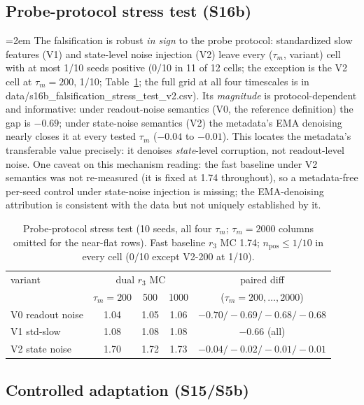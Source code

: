 \documentclass[preprint,12pt]{elsarticle}
\begin{document}
\subsection{Probe-protocol stress test (S16b)}
\label{sec:s16b}

{\emergencystretch=2em
The falsification is robust \emph{in sign} to the probe protocol:
standardized slow features (V1) and state-level noise injection (V2)
leave every ($\tau_m$, variant) cell with at most 1/10 seeds positive
(0/10 in 11 of 12 cells; the exception is the V2 cell at
$\tau_m{=}200$, 1/10; Table~\ref{tab:s16b}; the full grid at all four
timescales is in data/s16b\_falsification\_stress\_test\_v2.csv). Its
\emph{magnitude} is
protocol-dependent and informative: under readout-noise semantics (V0,
the reference definition) the gap is $-0.69$; under state-noise
semantics (V2) the metadata's EMA denoising nearly closes it at every tested
$\tau_m$ ($-0.04$ to $-0.01$). This locates the metadata's transferable
value precisely: it denoises \emph{state}-level corruption, not
readout-level noise. One caveat on this mechanism reading: the fast
baseline under V2 semantics was not re-measured (it is fixed at 1.74
throughout), so a metadata-free per-seed control under state-noise
injection is missing; the EMA-denoising attribution is consistent with
the data but not uniquely established by it.\par}

\begin{table}[t]
\centering
\small
\begin{tabular}{lcccc}
\toprule
variant & \multicolumn{3}{c}{dual $r_3$ MC} & paired diff \\
        & $\tau_m{=}200$ & 500 & 1000 & ($\tau_m{=}200,\dots,2000$) \\
\midrule
V0 readout noise & 1.04 & 1.05 & 1.06 & $-0.70/-0.69/-0.68/-0.68$ \\
V1 std-slow      & 1.08 & 1.08 & 1.08 & $-0.66$ (all) \\
V2 state noise   & 1.70 & 1.72 & 1.73 & $-0.04/-0.02/-0.01/-0.01$ \\
\bottomrule
\end{tabular}
\caption{Probe-protocol stress test (10 seeds, all four $\tau_m$;
$\tau_m{=}2000$ columns omitted for the near-flat rows). Fast baseline
$r_3$ MC 1.74; $n_{\mathrm{pos}} \le 1/10$ in every cell (0/10 except
V2-200 at 1/10).}
\label{tab:s16b}
\end{table}

\subsection{Controlled adaptation (S15/S5b)}
\label{sec:adapt}
\end{document}
